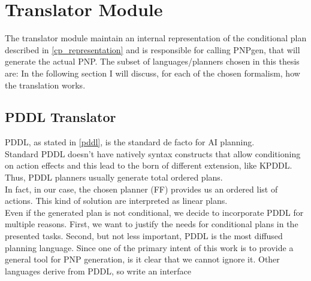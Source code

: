 \documentclass[pdftex,12pt,a4paper]{report}
\begin{document}
\section{Translator Module}
The translator module maintain an internal representation of the conditional plan described in \ref{cp_representation} and is responsible for calling PNPgen, that will generate the actual PNP.
The subset of languages/planners chosen in this thesis are:
In the following section I will discuss, for each of the chosen formalism, how the translation works.  

\subsection{PDDL Translator}
PDDL, as stated in \ref{pddl}, is the standard de facto for AI planning. \\
Standard PDDL doesn't have natively syntax constructs that allow conditioning on action effects and this lead to the born of different extension, like KPDDL.
Thus, PDDL planners usually generate total ordered plans.\\ 
In fact, in our case, the chosen planner (FF) provides us an ordered list of actions. This kind of solution are interpreted as linear plans.
\newline 
{}\\
\newline
Even if the generated plan is not conditional, we decide to incorporate PDDL for multiple reasons. First, we want to justify the needs for conditional plans in the presented tasks. Second, but not less important, PDDL is the most diffused planning language. Since one of the primary intent of this work is to provide a general tool for PNP generation, is it clear that we cannot ignore it. Other languages derive from PDDL, so write an 	interface   %
\end{document}
